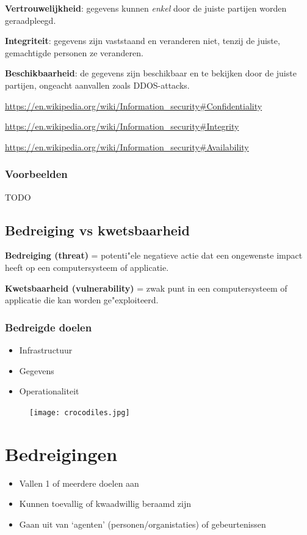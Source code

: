 \documentclass{article}
\newcommand{\bold}[1]{\textbf{#1}}
\begin{document}
\bold{Vertrouwelijkheid}: gegevens kunnen \textit{enkel} door de juiste partijen worden geraadpleegd.

\bold{Integriteit}: gegevens zijn vaststaand en veranderen niet, tenzij de juiste, gemachtigde personen ze veranderen.

\bold{Beschikbaarheid}: de gegevens zijn beschikbaar en te bekijken door de juiste partijen, ongeacht aanvallen zoals DDOS-attacks.

\url{https://en.wikipedia.org/wiki/Information_security#Confidentiality}

\url{https://en.wikipedia.org/wiki/Information_security#Integrity}

\url{https://en.wikipedia.org/wiki/Information_security#Availability}

\subsubsection{Voorbeelden}

TODO

\subsection{Bedreiging vs kwetsbaarheid}
\bold{Bedreiging (threat)} = potenti"ele negatieve actie dat een ongewenste impact heeft op een computersysteem of applicatie.

\bold{Kwetsbaarheid (vulnerability)} = zwak punt in een computersysteem of applicatie die kan worden ge"exploiteerd. 

\subsubsection{Bedreigde doelen}
\begin{itemize}
    \item Infrastructuur
    \item Gegevens
    \item Operationaliteit
\end{itemize}

\begin{figure}[H]
    \centering
    \texttt{[image: crocodiles.jpg]}
    \caption{}
\end{figure}

\section{Bedreigingen}

\begin{itemize}
    \item Vallen 1 of meerdere doelen aan
    \item Kunnen toevallig of kwaadwillig beraamd zijn
    \item Gaan uit van `agenten' (personen/organistaties) of gebeurtenissen
\end{itemize}
\end{document}
